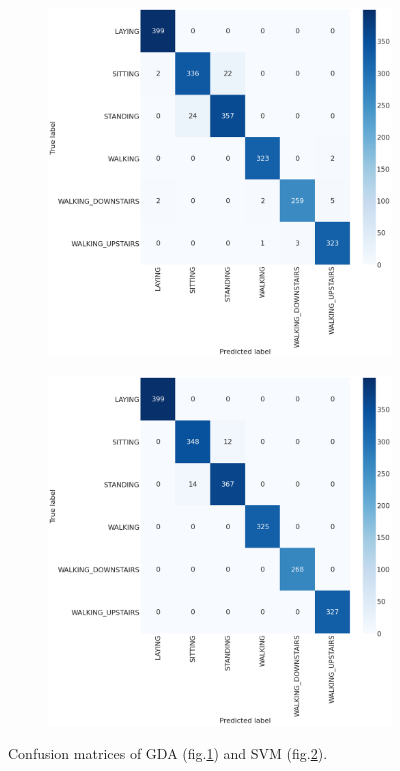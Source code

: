 \documentclass[a4paper,10pt,oneside]{article}
\begin{document}
\begin{figure}[ht]
 \center
 \begin{subfigure}{0.45\textwidth}
  \includegraphics[width=\linewidth]{conf_mat_gda}
  \caption{}
  \label{subfig:1}
 \end{subfigure}
 \begin{subfigure}{0.45\textwidth}
  \includegraphics[width=\linewidth]{conf_mat_svm}
  \caption{}
  \label{subfig:2}
 \end{subfigure}
 \caption{Confusion matrices of GDA (fig.\ref{subfig:1}) and SVM (fig.\ref{subfig:2}).}
 \label{fig:conf_mat} 
\end{figure}
\end{document}
